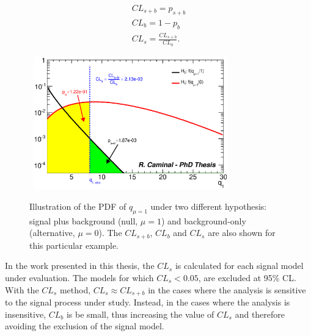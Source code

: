 \begin{equation}
\begin{split}
CL_{s+b} = p_{s+b} \\
CL_{b} = 1-p_{b} \\
CL_{s} = \frac{CL_{s+b}}{CL_{b}}.
\end{split}
\label{eq:CLsDefinition}
\end{equation}

\begin{figure}[!t]
  \begin{center}
    \mbox{
      \includegraphics[width=0.75\textwidth]{MonojetAnalysis/Figures/pdfTestHypothesisExample.eps}
    }
  \end{center}
  \caption[Illustration of the PDF of $q_{\mu}$ under the signal plus background and background-only hypotheses.]{Illustration of the PDF of $q_{\mu=1}$ under two different hypothesis: signal plus background (null, $\mu=1$) and background-only (alternative, $\mu=0$). The $CL_{s+b}$, $CL_b$ and $CL_s$ are also shown for this particular example.}
  \label{fig:pdfTestStatisticExample}
\end{figure}

In the work presented in this thesis, the $CL_s$ is calculated for each signal model under evaluation.
The models for which $CL_s < 0.05$, are excluded at 95\% CL.
With the $CL_s$ method, $CL_s \approx CL_{s+b}$ in the cases where the analysis is sensitive to the signal process under study.
Instead, in the cases where the analysis is insensitive, $CL_b$ is be small, thus increasing the value of $CL_s$ and therefore avoiding the exclusion of the signal model.
